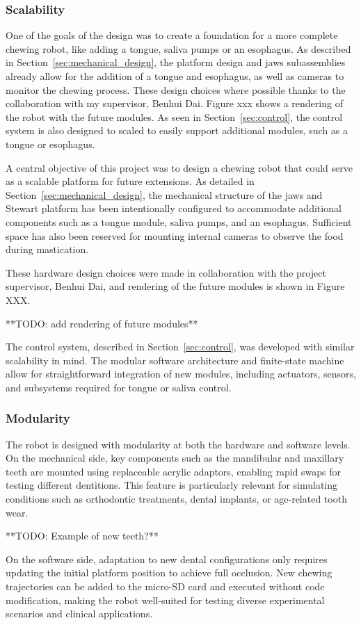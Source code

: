 \subsubsection{Scalability} One of the goals of the design was to create a foundation for a more complete chewing robot, like adding a tongue, saliva pumps or an esophagus. 
As described in Section~\ref{sec:mechanical_design}, the platform design and jaws subassemblies already allow for the addition of a tongue and esophagus, as well as cameras 
to monitor the chewing process. These design choices where possible thanks to the collaboration with my supervisor, Benhui Dai. Figure xxx shows a rendering of the 
robot with the future modules. As seen in Section~\ref{sec:control}, the control system is also designed to scaled to easily support additional modules, such as a tongue or esophagus. 

A central objective of this project was to design a chewing robot that could serve as a scalable platform for future extensions. As detailed in Section~\ref{sec:mechanical_design}, 
the mechanical structure of the jaws and Stewart platform has been intentionally configured to accommodate additional components such as a tongue module, saliva pumps, and an 
esophagus. Sufficient space has also been reserved for mounting internal cameras to observe the food during mastication.

These hardware design choices were made in collaboration with the project supervisor, Benhui Dai, and rendering of the future modules is shown in Figure XXX.

**TODO: add rendering of future modules**

The control system, described in Section~\ref{sec:control}, was developed with similar scalability in mind. The modular software architecture and finite-state machine 
allow for straightforward integration of new modules, including actuators, sensors, and subsystems required for tongue or saliva control.

\subsubsection{Modularity} 
The robot is designed with modularity at both the hardware and software levels. On the mechanical side, key components such as the mandibular and maxillary teeth are mounted using 
replaceable acrylic adaptors, enabling rapid swaps for testing different dentitions. This feature is particularly relevant for simulating conditions such as orthodontic treatments, 
dental implants, or age-related tooth wear.

**TODO: Example of new teeth?**

On the software side, adaptation to new dental configurations only requires updating the initial platform position to achieve full occlusion. New chewing trajectories can be added to 
the micro-SD card and executed without code modification, making the robot well-suited for testing diverse experimental scenarios and clinical applications.


